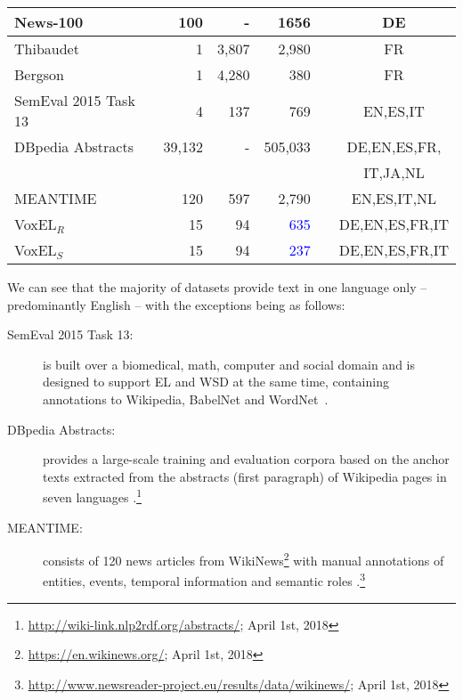 \documentclass{llncs}
\newcommand{\cmark}{\ding{51}}%
\newcommand{\xmark}{\ding{55}}%
\begin{document}
\begin{table}[tb!]
\begin{tabular}{lrrrcc}
News-100~\cite{n3}                  &100     &-      &1656    &\cmark  &DE \\\midrule
Thibaudet~\cite{renden2016}         &1       &3,807  &2,980   &\xmark  &FR \\\midrule
Bergson~\cite{renden2016}           &1       &4,280  &380     &\xmark  &FR \\\midrule
SemEval 2015 
Task 13~\cite{moro2015semeval}      &4       &137    &769     &\cmark &EN,ES,IT \\ \midrule
DBpedia Abstracts
~\cite{abstracts2016}               &39,132  &-      &505,033 &\xmark &DE,EN,ES,FR, \\
                                    &        &       &        &       &IT,JA,NL \\\midrule
MEANTIME \cite{meantime2016}        &120     &597    &2,790   &\xmark &EN,ES,IT,NL \\\midrule 
VoxEL$_R$                           &15      &94     &\textcolor{blue}{635}     &\cmark &DE,EN,ES,FR,IT\\\midrule  
VoxEL$_S$                           &15      &94     &\textcolor{blue}{237}     &\cmark &DE,EN,ES,FR,IT\\ 
\bottomrule
\end{tabular}
\end{table}

We can see that the majority of datasets provide text in one language only -- predominantly English -- with the exceptions being as follows: 

\begin{description}
\item[SemEval 2015 Task 13:] is built over a biomedical, math, computer and social domain and is designed to support EL and WSD at the same time, containing annotations to Wikipedia, BabelNet and WordNet~\cite{moro2015semeval}.
\item[DBpedia Abstracts:] provides a large-scale training and evaluation corpora based on the anchor texts extracted from the abstracts (first paragraph) of Wikipedia pages in seven languages \cite{abstracts2016}.\footnote{\url{http://wiki-link.nlp2rdf.org/abstracts/}; April 1st, 2018} 
\item[MEANTIME:] consists of 120 news articles from WikiNews\footnote{\url{https://en.wikinews.org/}; April 1st, 2018} with manual annotations of entities, events, temporal information and semantic roles \cite{meantime2016}.\footnote{\url{http://www.newsreader-project.eu/results/data/wikinews/}; April 1st, 2018} 
\end{description}
\end{document}
